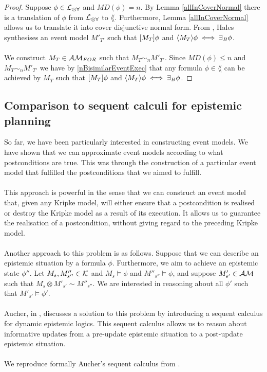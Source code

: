 \begin{proof}
Suppose $\phi \in \mathcal{L}_{\otimes\forall}$ and $MD(\phi) = n$.
By Lemma \ref{allInCoverNormal} there is a translation of $\phi$ from $\mathcal{L}_{\otimes\forall}$ to $\lang$.
Furthermore, Lemma \ref{allInCoverNormal} allows us to translate it into cover disjunctive normal form.
From \FIXME, Hales synthesises an event model $M'_{T'}$ such that $[{M_T}] \phi$ and $\langle {M_T} \rangle
\phi \iff \exists_B \phi$.\\
\\
We construct $M_T \in \mathcal{AM}_{FOR}$ such that $M_T \sim_n M'_{T'}$.
Since $MD(\phi) \leq n$ and $M_T \sim_n M'_{T'}$ we have by \ref{nBisimilarEventExec} that any
formula $\phi \in \lang$ can be achieved by $M_T$ such that $[{M_T}] \phi$ and $\langle {M_T} \rangle \phi
\iff \exists_B \phi$.
\end{proof}

\subsection{Comparison to sequent calculi for epistemic planning}

So far, we have been particularly interested in constructing event models.
We have shown that we can approximate event models according to what
postconditions are true.
This was through the construction of a particular event model that fulfilled
the postconditions that we aimed to fulfill.\\
\\
This approach is powerful in the sense that we can construct an event model
that, given any Kripke model, will either ensure that a postcondition
is realised or destroy the Kripke model as a result of its execution.
It allows us to guarantee the realisation of a postcondition, without giving
regard to the preceding Kripke model.\\
\\
Another approach to this problem is as follows.
Suppose that we can describe an epistemic situation by a formula $\phi$.
Furthermore, we aim to achieve an epistemic state $\phi''$.
Let $M_s, M''_{s''} \in \mathcal{K}$ and $M_s \models \phi$ and $M''_{s''}
\models \phi$, and suppose $M'_{s'} \in \mathcal{AM}$ such that $M_s \otimes
M'_{s'} \sim M''_{s''}$.
We are interested in reasoning about all $\phi'$ such that $M'_{s'}
\models \phi'$.\\
\\
Aucher, in \cite{doi:10.3166/jancl.21.289-321,doi:10.1080/11663081.2012.736703},
discusses a solution to this problem by introducing a sequent calculus for dynamic 
epistemic logics.
This sequent calculus allows us to reason about informative updates from
a pre-update epistemic situation to a post-update epistemic situation.\\
\\
We reproduce formally Aucher's sequent calculus from
\cite{doi:10.1080/11663081.2012.736703}.

